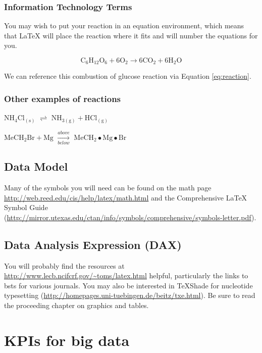 \documentclass[]{book}
\begin{document}
\subsection{Information Technology
Terms}\label{information-technology-terms}

You may wish to put your reaction in an equation environment, which
means that LaTeX will place the reaction where it fits and will number
the equations for you.

\begin{equation}
  \mathrm{C_6H_{12}O_6  + 6O_2} \longrightarrow \mathrm{6CO_2 + 6H_2O}
  \label{eq:reaction}
\end{equation}

We can reference this combustion of glucose reaction via Equation
\eqref{eq:reaction}.

\subsection{Other examples of
reactions}\label{other-examples-of-reactions}

\(\mathrm{NH_4Cl_{(s)}}\) \(\rightleftharpoons\)
\(\mathrm{NH_{3(g)}+HCl_{(g)}}\)

\noindent \(\mathrm{MeCH_2Br + Mg}\) \(\xrightarrow[below]{above}\)
\(\mathrm{MeCH_2\bullet Mg \bullet Br}\)

\section{Data Model}\label{data-model}

Many of the symbols you will need can be found on the math page
\url{http://web.reed.edu/cis/help/latex/math.html} and the Comprehensive
LaTeX Symbol Guide
(\url{http://mirror.utexas.edu/ctan/info/symbols/comprehensive/symbols-letter.pdf}).

\section{Data Analysis Expression
(DAX)}\label{data-analysis-expression-dax}

You will probably find the resources at
\url{http://www.lecb.ncifcrf.gov/~toms/latex.html} helpful, particularly
the links to bsts for various journals. You may also be interested in
TeXShade for nucleotide typesetting
(\url{http://homepages.uni-tuebingen.de/beitz/txe.html}). Be sure to
read the proceeding chapter on graphics and tables.

\chapter{KPIs for big data}\label{kpis-for-big-data}
\end{document}
